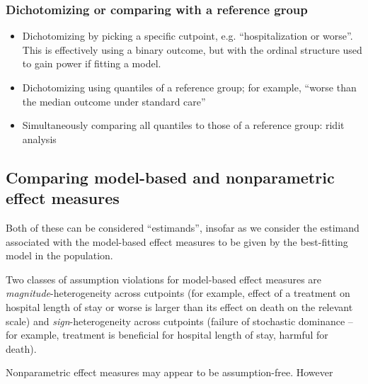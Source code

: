 \documentclass[
  11pt,
  fleqn
]{article}
\begin{document}
\subsubsection{Dichotomizing or comparing with a reference group}

\begin{itemize}
  \item Dichotomizing by picking a specific cutpoint,
    e.g. ``hospitalization or
    worse''. This is effectively using a binary outcome, but with the
    ordinal structure used to gain power if fitting a model.
  \item Dichotomizing using quantiles of a reference
    group; for example,
    ``worse than the median outcome under standard care''
  \item Simultaneously comparing all quantiles to those of a
    reference group: ridit analysis
    \citep{brossHowUseRidit1958,agrestiAnalysisOrdinalCategorical2010,
      smithsonReceiverOperatingCharacteristic2023,
    jansenRiditAnalysisReview1984}
\end{itemize}

\subsection{Comparing model-based and nonparametric effect measures}

Both of these can be considered ``estimands'', insofar as we consider the
estimand associated with the model-based effect measures to be given by the
best-fitting model in the population.

Two classes of assumption violations for model-based effect measures
are \emph{magnitude}-heterogeneity across cutpoints (for example,
  effect of a treatment on hospital length of stay or worse is larger
  than its effect on
death on the relevant scale) and
\emph{sign}-heterogeneity
across cutpoints (failure of stochastic dominance -- for example,
treatment is beneficial for hospital length of stay, harmful for death).

Nonparametric effect measures may appear to be assumption-free. However
\end{document}

